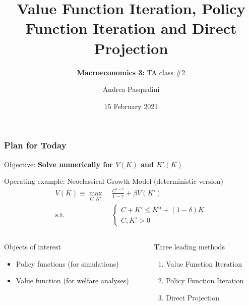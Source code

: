 \documentclass[10pt, aspectratio=1610, handout]{beamer}
\title[VFI, PFI and DP]{
  \textbf{Value Function Iteration, Policy Function Iteration and Direct Projection}
}
\subtitle[Macro 3: TA\#2]{
  \textbf{Macroeconomics 3:} TA class \#2
}
\author[A.~Pasqualini]{
  Andrea Pasqualini
}
\institute[Bocconi]{Bocconi University}
\date{
  15 February 2021
}
\begin{document}
  \begin{frame}
    \maketitle
  \end{frame}

  \begin{frame}
    \frametitle{Plan for Today}

    Objective: \textbf{Solve numerically for $V(K)$ and $K'(K)$}

    \vfill\pause

    Operating example: Neoclassical Growth Model (deterministic version)
    \begin{align*}
      V(K) \equiv \max_{C, K'} &\; \frac{C^{1 - \gamma}}{1 - \gamma} + \beta V(K') \\
      \text{s.t.} &\;
      \begin{cases}
        C + K' \leq K^\alpha + (1 - \delta) K \\
        C, K' > 0
      \end{cases}
    \end{align*}

    \vfill\pause

    \begin{columns}[T]
      \begin{column}{0.45\textwidth}
        Objects of interest
        \begin{itemize}
          \item Policy functions (for simulations)
          \item Value function (for welfare analyses)
        \end{itemize}
      \end{column}
      \begin{column}{0.35\textwidth}
        Three leading methods
        \begin{enumerate}
          \item Value Function Iteration
          \item Policy Function Iteration
          \item Direct Projection
        \end{enumerate}
      \end{column}
    \end{columns}

  \end{frame}
\end{document}
